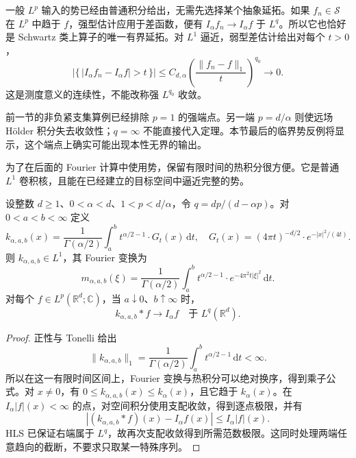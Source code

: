 一般 \(L^p\) 输入的势已经由普通积分给出，无需先选择某个抽象延拓。如果 \(f_n\in\mathcal S\) 在 \(L^p\) 中趋于 \(f\)，强型估计应用于差函数，便有 \(I_\alpha f_n\to I_\alpha f\) 于 \(L^q\)。所以它也恰好是 Schwartz 类上算子的唯一有界延拓。对 \(L^1\) 逼近，弱型差估计给出对每个 \(t>0\)，
\[
 \bigl|\{\,|I_\alpha f_n-I_\alpha f|>t\,\}\bigr|
 \leq C_{d,\alpha}
       \left(\frac{\|f_n-f\|_1}{t}\right)^{q_0}\longrightarrow0.
\]
这是测度意义的连续性，不能改称强 \(L^{q_0}\) 收敛。

\ProseParagraphBreak

前一节的非负紧支集算例已经排除 \(p=1\) 的强端点。另一端 \(p=d/\alpha\) 则使远场 Hölder 积分失去收敛性；\(q=\infty\) 不能直接代入定理。本节最后的临界势反例将显示，这个端点上确实可能出现本性无界的输出。

\ProseParagraphBreak

为了在后面的 Fourier 计算中使用势，保留有限时间的热积分很方便。它是普通 \(L^1\) 卷积核，且能在已经建立的目标空间中逼近完整的势。
\begin{proposition}\label{b2:prop:19-potential-approximation}
设整数 \(d\geq1\)、\(0<\alpha<d\)、\(1<p<d/\alpha\)，令 \(q=dp/(d-\alpha p)\)。对 \(0<a<b<\infty\) 定义
\begin{equation}\label{b2:eq:19-potential-heat-truncation}
 k_{\alpha,a,b}(x)=\frac1{\Gamma(\alpha/2)}
 \int_a^b t^{\alpha/2-1}\cdot G_t(x)\,\mathrm dt,
 \quad G_t(x)=(4\pi t)^{-d/2}\cdot e^{-|x|^2/(4t)}.
\end{equation}
则 \(k_{\alpha,a,b}\in L^1\)，其 Fourier 变换为
\[
 m_{\alpha,a,b}(\xi)=\frac1{\Gamma(\alpha/2)}
 \int_a^b t^{\alpha/2-1}\cdot e^{-4\pi^2t|\xi|^2}\,\mathrm dt.
\]
对每个 \(f\in L^p(\mathbb R^d;\mathbb C)\)，当 \(a\downarrow0\)、\(b\uparrow\infty\) 时，
\[
 k_{\alpha,a,b}*f\longrightarrow I_\alpha f
 \quad\text{于 }L^q(\mathbb R^d).
\]
\end{proposition}
\begin{proof}
正性与 Tonelli 给出
\[
 \|k_{\alpha,a,b}\|_1
 =\frac1{\Gamma(\alpha/2)}\int_a^b t^{\alpha/2-1}\,\mathrm dt<\infty.
\]
所以在这一有限时间区间上，Fourier 变换与热积分可以绝对换序，得到乘子公式。对 \(x\ne0\)，有 \(0\leq k_{\alpha,a,b}(x)\leq k_\alpha(x)\)，且它趋于 \(k_\alpha(x)\)。在 \(I_\alpha|f|(x)<\infty\) 的点，对空间积分使用支配收敛，得到逐点极限，并有
\[
 |(k_{\alpha,a,b}*f)(x)-I_\alpha f(x)|
 \leq I_\alpha|f|(x).
\]
HLS 已保证右端属于 \(L^q\)，故再次支配收敛得到所需范数极限。这同时处理两端任意趋向的截断，不要求只取某一特殊序列。
\end{proof}

